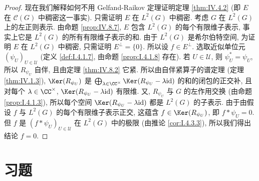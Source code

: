 \begin{proof}
现在我们解释如何不用 Gelfand-Raikov 定理证明定理 \ref{thm:IV.4.2} (即 $E$ 在 $\mathcal{C}(G)$ 中稠密这一事实). 只需证明 $E$ 在 $L^2(G)$ 中稠密. 考虑 $G$ 在 $L^2(G)$ 上的左正则表示. 由命题 \ref{prop:IV.8.7}, $E$ 包含 $L^2(G)$ 的每个有限维子表示, 事实上它是 $L^2(G)$ 的所有有限维子表示的和. 由于 $L^2(G)$ 是希尔伯特空间, 为证明 $E$ 在 $L^2(G)$ 中稠密, 只需证明 $E^{\perp} = \{0\}$. 所以设 $f \in E^{\perp}$. 选取近似单位元 $(\psi_U)_{U \in \mathcal{U}}$ (定义 \ref{def:I.4.1.7}, 由命题 \ref{prop:I.4.1.8} 存在). 若 $U \in \mathcal{U}$, 则 $\psi_U^* = \psi_U$, 所以 $R_{\psi_U}$ 自伴, 且由定理 \ref{thm:IV.8.2} 它紧. 所以由自伴紧算子的谱定理 (定理 \ref{thm:IV.1.3}), $\Ker(R_{\psi_U})$ 是 $\bigoplus_{\lambda \in \CC^{\times}}\Ker(R_{\psi_U} - \lambda\mathrm{id})$ 的和的闭包的正交补, 且对每个 $\lambda \in \CC^{\times}$, $\Ker(R_{\psi_U} - \lambda\mathrm{id})$ 有限维. 又, $R_{\psi_U}$ 与 $G$ 的左作用交换 (由命题 \ref{prop:I.4.1.3}), 所以每个空间 $\Ker(R_{\psi_U} - \lambda\mathrm{id})$ 都是 $L^2(G)$ 的子表示. 由于由假设 $f$ 与 $L^2(G)$ 的每个有限维子表示正交, 这蕴含 $f \in \Ker(R_{\psi_U})$, 即 $f * \psi_U = 0$. 但 $f$ 是 $(f * \psi_U)_{U \in \mathcal{U}}$ 在 $L^2(G)$ 中的极限 (由推论 \ref{cor:I.4.3.3}), 所以我们得出结论 $f = 0$.
\end{proof}

\section{习题}

